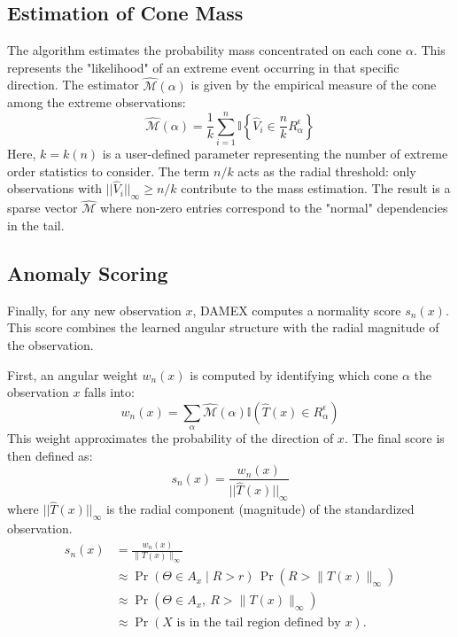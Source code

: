 \documentclass[11pt]{article}
\begin{document}
\subsection{Estimation of Cone Mass}
The algorithm estimates the probability mass concentrated on each cone $\alpha$. This represents the "likelihood" of an extreme event occurring in that specific direction. The estimator $\hat{\mathcal{M}}(\alpha)$ is given by the empirical measure of the cone among the extreme observations:
\begin{equation}
    \hat{\mathcal{M}}(\alpha) = \frac{1}{k} \sum_{i=1}^n \mathbb{I} \left\{ \hat{V}_i \in \frac{n}{k} R_\alpha^\epsilon \right\}
\end{equation}
Here, $k=k(n)$ is a user-defined parameter representing the number of extreme order statistics to consider. The term $n/k$ acts as the radial threshold: only observations with $||\hat{V}_i||_\infty \ge n/k$ contribute to the mass estimation. The result is a sparse vector $\hat{\mathcal{M}}$ where non-zero entries correspond to the "normal" dependencies in the tail.

\subsection{Anomaly Scoring}
Finally, for any new observation $x$, DAMEX computes a normality score $s_n(x)$. This score combines the learned angular structure with the radial magnitude of the observation.

First, an angular weight $w_n(x)$ is computed by identifying which cone $\alpha$ the observation $x$ falls into:
\begin{equation}
    w_n(x) = \sum_{\alpha} \hat{\mathcal{M}}(\alpha) \mathbb{I}(\hat{T}(x) \in R_\alpha^\epsilon)
\end{equation}
This weight approximates the probability of the direction of $x$. The final score is then defined as:
\begin{equation}
    s_n(x) = \frac{w_n(x)}{||\hat{T}(x)||_\infty}
\end{equation}
where $||\hat{T}(x)||_\infty$ is the radial component (magnitude) of the standardized observation.
\begin{align*}
    s_n(x) &= \frac{w_n(x)}{\lVert T(x) \rVert_{\infty}}\\
        &\approx \Pr(\Theta \in A_x \mid R > r)\, \Pr(R > \lVert T(x) \rVert_{\infty})\\
        &\approx \Pr(\Theta \in A_x,\ R > \lVert T(x) \rVert_{\infty})\\
        &\approx \Pr\!\left(X \text{ is in the tail region defined by } x\right).
\end{align*}
\end{document}
